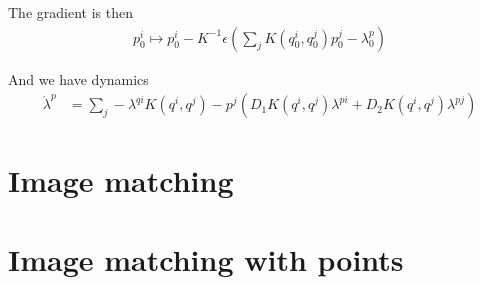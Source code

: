 \documentclass{article}
\begin{document}
The gradient is then
\begin{align*}
p_0^i \mapsto p_0^i - K^{-1}\epsilon (\sum_j K(q_0^i,q_0^j)p_0^j - \lambda^p_0)
\end{align*}

And we have dynamics
\begin{align*}
\dot \lambda^p &= \sum_j -\lambda^{qi}K(q^i,q^j) - p^j (D_1 K(q^i,q^j)\lambda^{pi} + D_2K(q^i,q^j)\lambda^{pj})
\end{align*}

\section{Image matching}

\section{Image matching with points}
\end{document}

